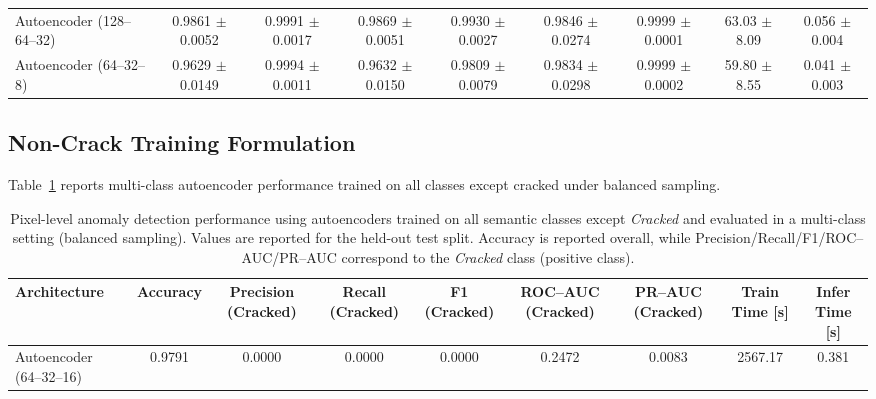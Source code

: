 \begin{landscape}
\begin{table}[!htbp]
\begin{adjustbox}{max width=\linewidth,center}
\begin{tabular}{@{}lcccccccc@{}}
        Autoencoder (128--64--32)
        & 0.9861 $\pm$ 0.0052
        & 0.9991 $\pm$ 0.0017
        & 0.9869 $\pm$ 0.0051
        & 0.9930 $\pm$ 0.0027
        & 0.9846 $\pm$ 0.0274
        & 0.9999 $\pm$ 0.0001
        & 63.03 $\pm$ 8.09
        & 0.056 $\pm$ 0.004 \\

        Autoencoder (64--32--8)
        & 0.9629 $\pm$ 0.0149
        & 0.9994 $\pm$ 0.0011
        & 0.9632 $\pm$ 0.0150
        & 0.9809 $\pm$ 0.0079
        & 0.9834 $\pm$ 0.0298
        & 0.9999 $\pm$ 0.0002
        & 59.80 $\pm$ 8.55
        & 0.041 $\pm$ 0.003 \\

        \bottomrule
    \end{tabular}
    \end{adjustbox}
\end{table}

\subsection{Non-Crack Training Formulation}

\noindent
Table~\ref{tab:autoencoder_pixel_results_noncrack_multiclass_balanced} reports multi-class autoencoder performance trained on all classes except cracked under balanced sampling.


\begin{table}[!htbp]
    \centering
    \caption[Autoencoder anomaly detection: non-CRACK balanced (full CV)]{Pixel-level anomaly detection performance using autoencoders trained on all semantic classes except \textit{Cracked} and evaluated in a multi-class setting (balanced sampling).
    Values are reported for the held-out test split.
    Accuracy is reported overall, while Precision/Recall/F1/ROC--AUC/PR--AUC correspond to the \textit{Cracked} class (positive class).}
    \label{tab:autoencoder_pixel_results_noncrack_multiclass_balanced}
    \small
    \renewcommand{\arraystretch}{1.25}
    \setlength{\tabcolsep}{7pt}
    \begin{adjustbox}{max width=\linewidth,center}
    \begin{tabular}{@{}lcccccccc@{}}
        \toprule
        Architecture &
        Accuracy &
        Precision (Cracked) &
        Recall (Cracked) &
        F1 (Cracked) &
        ROC--AUC (Cracked) &
        PR--AUC (Cracked) &
        Train Time [s] &
        Infer Time [s] \\
        \midrule

        Autoencoder (64--32--16)
        & 0.9791
        & 0.0000
        & 0.0000
        & 0.0000
        & 0.2472
        & 0.0083
        & 2567.17
        & 0.381 \\


\end{tabular}
\end{adjustbox}
\end{table}
\end{landscape}
